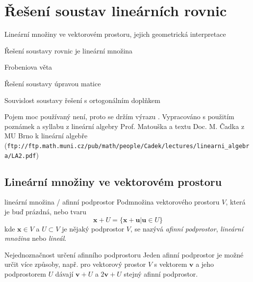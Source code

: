 \def\b#1{\mathbf{#1}}
\def\Ker{\mathrm{Ker\ }}
\def\Real{\mathbb{R}}
\def\rank{\mathrm{rank}}
\def\dim{\mathrm{dim}}
\def\Span{\mathcal{L}}


\section{Řešení soustav lineárních rovnic}

\begin{pozadavky}
\begin{pitemize}
    \item Lineární množiny ve vektorovém prostoru, jejich geometrická interpretace
    \item Řešení soustavy rovnic je lineární množina
    \item Frobeniova věta 
    \item Řešení soustavy úpravou matice 
    \item Souvislost soustavy řešení s ortogonálním doplňkem
\end{pitemize}
\end{pozadavky}

Pojem  moc používaný není, proto se držím výrazu . Vypracováno s použitím poznámek a syllabu z lineární algebry Prof. Matouška a textu Doc. M. Čadka z MU Brno k lineární algebře \\(\texttt{ftp://ftp.math.muni.cz/pub/math/people/Cadek/lectures/linearni\_algebra/LA2.pdf})\\

\subsection{Lineární množiny ve vektorovém prostoru}

\begin{definiceN}{lineární množina / afinní podprostor}
Podmnožina vektorového prostoru $V$, která je buď prázdná, nebo tvaru
$$\b{x}+U=\{\b{x}+\b{u}|\b{u}\in U\}$$
kde $\b{x}\in V$ a $U\subset V$ je nějaký podprostor $V$, se nazývá \emph{afinní podprostor}, \emph{lineární množina} nebo \emph{lineál}.
\end{definiceN}

\begin{poznamkaN}{Nejednoznačnost určení afinního podprostoru}
Jeden afinní podprostor je možné určit více způsoby, např. pro vektorový prostor $V$ s vektorem $\b{v}$ a jeho podprostorem $U$ dávají $\b{v}+U$ a $2\b{v}+U$ stejný afinní podprostor.
\end{poznamkaN}

